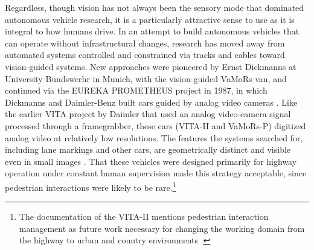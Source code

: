 Regardless, though vision has not always been the sensory mode that dominated
autonomous vehicle research, it is a particularly attractive sense to
use as it is integral to how humans drive. In an attempt to build
autonomous vehicles that can operate without infrastructural changes,
research has moved away from automated systems controlled and
constrained via tracks and cables toward vision-guided
systems. New approaches were pioneered by Ernst Dickmanns at
University Bundswerhr in Munich, with the vision-guided VaMoRs van,
and continued via the EUREKA PROMETHEUS project in 1987, in which
Dickmanns and Daimler-Benz built cars guided by analog video
cameras \cite{ulmerVITA-II}. Like the earlier VITA project by Daimler that used an
analog video-camera signal processed through a framegrabber, these
cars (VITA-II and VaMoRs-P) digitized analog video at relatively low resolutions. The
features the systems searched for, including lane markings and other
cars, are geometrically distinct and visible even in small
images \cite{ulmerVITA}. That these vehicles were designed primarily for
highway operation under constant human supervision made this strategy
acceptable, since pedestrian interactions were likely to be
rare.\footnote{The documentation of the VITA-II mentions pedestrian
  interaction management as future work necessary for changing the
  working domain from the highway to urban and country environments \cite{ulmerVITA-II}.}


